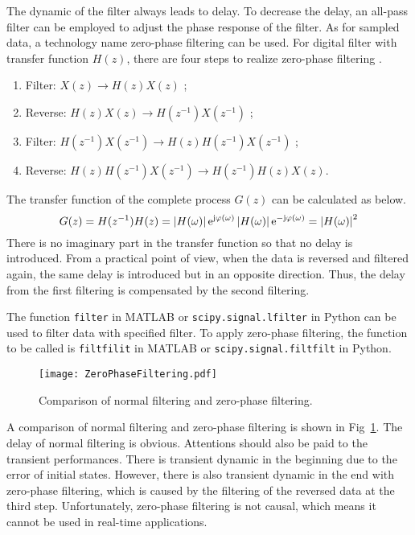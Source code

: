 The dynamic of the filter always leads to delay. To decrease the delay, an all-pass filter can be employed to adjust the phase response of the filter. As for sampled data, a technology name zero-phase filtering can be used. For digital filter with transfer function $H(z)$, there are four steps to realize zero-phase filtering \cite{mExamples}.
\begin{enumerate}
    \setlength{\itemsep}{0pt}
    \item Filter: $X(z) \rightarrow H(z)X(z)$ ;
    \item Reverse: $H(z)X(z) \rightarrow H(z^{-1})X(z^{-1})$ ;
    \item Filter: $H(z^{-1})X(z^{-1}) \rightarrow H(z)H(z^{-1})X(z^{-1})$ ;
    \item Reverse: $H(z)H(z^{-1})X(z^{-1}) \rightarrow H(z^{-1})H(z)X(z)$.
\end{enumerate}
The transfer function of the complete process $G(z)$ can be calculated as below.
\begin{equation}
    G(z) = H(z^{-1})H(z) = \left| H(\omega) \right| \mathrm{e}^{\mathrm{j} \varphi (\omega)} \left| H(\omega) \right| \mathrm{e}^{-\mathrm{j} \varphi (\omega)}  = \left| H(\omega) \right|^2
\end{equation}
There is no imaginary part in the transfer function so that no delay is introduced. From a practical point of view, when the data is reversed and filtered again, the same delay is introduced but in an opposite direction. Thus, the delay from the first filtering is compensated by the second filtering.


The function \verb|filter| in MATLAB or \verb|scipy.signal.lfilter| in Python can be used to filter data with specified filter. To apply zero-phase filtering, the function to be called is \verb|filtfilit| in MATLAB or \verb|scipy.signal.filtfilt| in Python. 


\begin{figure}[!htb]
    \centering
    \texttt{[image: ZeroPhaseFiltering.pdf]}
    \caption{Comparison of normal filtering and zero-phase filtering.}
    \label{fig:zerofiltering}
\end{figure}


A comparison of normal filtering and zero-phase filtering is shown in Fig~\ref{fig:zerofiltering}. The delay of normal filtering is obvious. Attentions should also be paid to the transient performances. There is transient dynamic in the beginning due to the error of initial states. However, there is also transient dynamic in the end with zero-phase filtering, which is caused by the filtering of the reversed data at the third step. Unfortunately, zero-phase filtering is not causal, which means it cannot be used in real-time applications.





